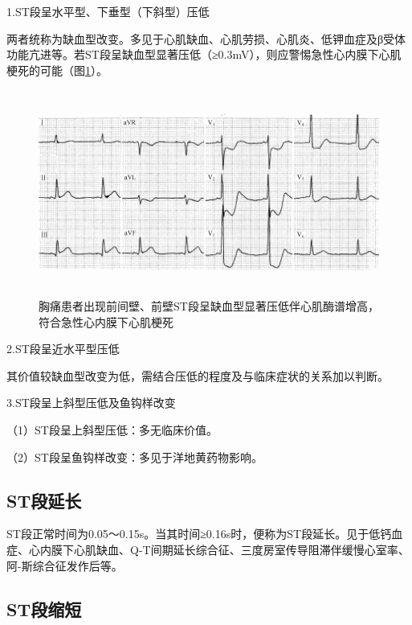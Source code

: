 1.ST段呈水平型、下垂型（下斜型）压低

两者统称为缺血型改变。多见于心肌缺血、心肌劳损、心肌炎、低钾血症及β受体功能亢进等。若ST段呈缺血型显著压低（≥0.3mV），则应警惕急性心内膜下心肌梗死的可能（图\ref{fig5-8}）。

\begin{figure}[!htbp]
 \centering
 \includegraphics[width=5.78125in,height=2.65625in]{./images/Image00089.jpg}
 \captionsetup{justification=centering}
 \caption{胸痛患者出现前间壁、前壁ST段呈缺血型显著压低伴心肌酶谱增高，符合急性心内膜下心肌梗死}
 \label{fig5-8}
  \end{figure} 

2.ST段呈近水平型压低

其价值较缺血型改变为低，需结合压低的程度及与临床症状的关系加以判断。

3.ST段呈上斜型压低及鱼钩样改变

（1）ST段呈上斜型压低：多无临床价值。

（2）ST段呈鱼钩样改变：多见于洋地黄药物影响。

\protect\hypertarget{text00011.htmlux5cux23subid81}{}{}

\subsection{ST段延长}

ST段正常时间为0.05～0.15s。当其时间≥0.16s时，便称为ST段延长。见于低钙血症、心内膜下心肌缺血、Q-T间期延长综合征、三度房室传导阻滞伴缓慢心室率、阿-斯综合征发作后等。

\protect\hypertarget{text00011.htmlux5cux23subid82}{}{}

\subsection{ST段缩短}

